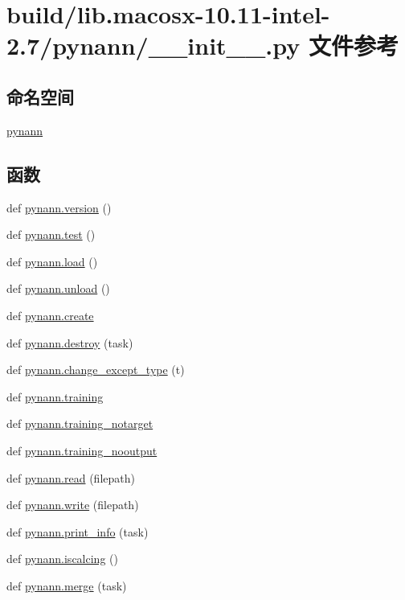 \hypertarget{build_2lib_8macosx-10_811-intel-2_87_2pynann_2____init_____8py}{}\section{build/lib.macosx-\/10.11-\/intel-\/2.7/pynann/\+\_\+\+\_\+init\+\_\+\+\_\+.py 文件参考}
\label{build_2lib_8macosx-10_811-intel-2_87_2pynann_2____init_____8py}
\subsection*{命名空间}
\begin{DoxyCompactItemize}
\item 
 \hyperlink{namespacepynann}{pynann}
\end{DoxyCompactItemize}
\subsection*{函数}
\begin{DoxyCompactItemize}
\item 
def \hyperlink{namespacepynann_a4dd5d3bc6dc56e2456e6b7f9b7215ab7}{pynann.\+version} ()
\item 
def \hyperlink{namespacepynann_ada5f3e7105e806c2bc05a8e63a32b57e}{pynann.\+test} ()
\item 
def \hyperlink{namespacepynann_ace6e3d4e6aacb9f2d3e26bb3e917ae76}{pynann.\+load} ()
\item 
def \hyperlink{namespacepynann_ad3feafb695c7b9b3c9471dcf601f43e4}{pynann.\+unload} ()
\item 
def \hyperlink{namespacepynann_ab15b41c10f9568d70c75b1c8a41ebdda}{pynann.\+create}
\item 
def \hyperlink{namespacepynann_a1bf1031bdd7b52dc5f2f3e113ae55681}{pynann.\+destroy} (task)
\item 
def \hyperlink{namespacepynann_a4cfc87f32d6180e32a6cff7986ba2a3f}{pynann.\+change\+\_\+except\+\_\+type} (t)
\item 
def \hyperlink{namespacepynann_ae2b74b90563f7fb83c6472fef6aaaeba}{pynann.\+training}
\item 
def \hyperlink{namespacepynann_a00afa3409ad462a7cc3c2d8914dc80c6}{pynann.\+training\+\_\+notarget}
\item 
def \hyperlink{namespacepynann_a3f39ce22cdaec6e20913632fc10b0613}{pynann.\+training\+\_\+nooutput}
\item 
def \hyperlink{namespacepynann_a4fabfddf6731106757ddf26899f73e2a}{pynann.\+read} (filepath)
\item 
def \hyperlink{namespacepynann_a897d7a8f954b4e97578e0044f653fa10}{pynann.\+write} (filepath)
\item 
def \hyperlink{namespacepynann_a9ea87f485af0cd4098ae8fdb2bb69f5f}{pynann.\+print\+\_\+info} (task)
\item 
def \hyperlink{namespacepynann_a3e79311e297d87898c02a6ec0cd6f578}{pynann.\+iscalcing} ()
\item 
def \hyperlink{namespacepynann_ac514bb724edbcb6fdcf70e8d6baacc19}{pynann.\+merge} (task)
\end{DoxyCompactItemize}
